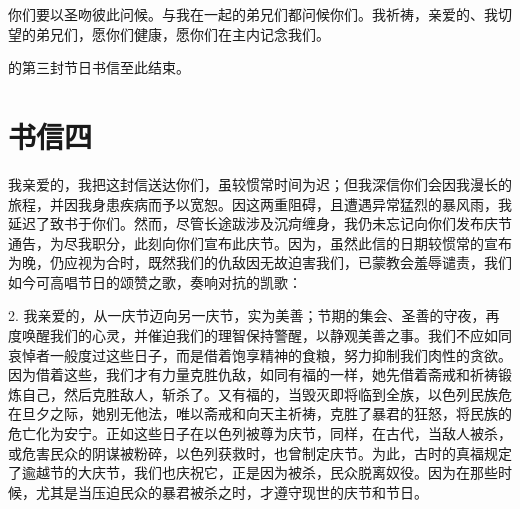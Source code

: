 你们要以圣吻彼此问候。与我在一起的弟兄们都问候你们。我祈祷，亲爱的、我切望的弟兄们，愿你们健康，愿你们在主内记念我们。\par

的第三封节日书信至此结束。\par



\section{书信四}

\par

\par

我亲爱的，我把这封信送达你们，虽较惯常时间为迟；但我深信你们会因我漫长的旅程，并因我身患疾病而予以宽恕。因这两重阻碍，且遭遇异常猛烈的暴风雨，我延迟了致书于你们。然而，尽管长途跋涉及沉疴缠身，我仍未忘记向你们发布庆节通告，为尽我职分，此刻向你们宣布此庆节。因为，虽然此信的日期较惯常的宣布为晚，仍应视为合时，既然我们的仇敌因无故迫害我们，已蒙教会羞辱谴责，我们如今可高唱节日的颂赞之歌，奏响对抗的凯歌：\par

2. 我亲爱的，从一庆节迈向另一庆节，实为美善；节期的集会、圣善的守夜，再度唤醒我们的心灵，并催迫我们的理智保持警醒，以静观美善之事。我们不应如同哀悼者一般度过这些日子，而是借着饱享精神的食粮，努力抑制我们肉性的贪欲。因为借着这些，我们才有力量克胜仇敌，如同有福的一样，她先借着斋戒和祈祷锻炼自己，然后克胜敌人，斩杀了。又有福的，当毁灭即将临到全族，以色列民族危在旦夕之际，她别无他法，唯以斋戒和向天主祈祷，克胜了暴君的狂怒，将民族的危亡化为安宁。正如这些日子在以色列被尊为庆节，同样，在古代，当敌人被杀，或危害民众的阴谋被粉碎，以色列获救时，也曾制定庆节。为此，古时的真福规定了逾越节的大庆节，我们也庆祝它，正是因为被杀，民众脱离奴役。因为在那些时候，尤其是当压迫民众的暴君被杀之时，才遵守现世的庆节和节日。\par

